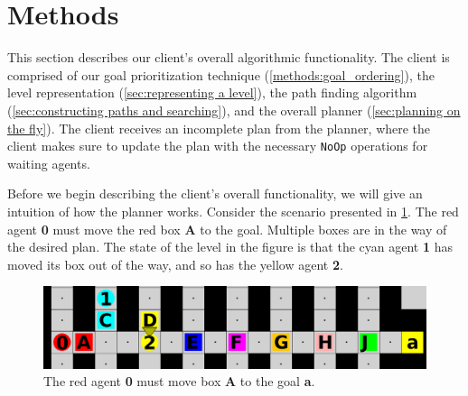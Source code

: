 \section{Methods}
\label{sec:methods}


This section describes our client's overall algorithmic functionality.
The client is comprised of our goal prioritization technique (\cref{methods:goal_ordering}), the level representation (\cref{sec:representing a level}), the path finding algorithm (\cref{sec:constructing paths and searching}), and the overall planner (\cref{sec:planning on the fly}).
The client receives an incomplete plan from the planner, where the client makes sure to update the plan with the necessary \texttt{NoOp} operations for waiting agents.

Before we begin describing the client's overall functionality, we will give an intuition of how the planner works.
Consider the scenario presented in \cref{fig:intuition example}.
The red agent \textbf{0} must move the red box \textbf{A} to the goal.
Multiple boxes are in the way of the desired plan.
The state of the level in the figure is that the cyan agent \textbf{1} has moved its box out of the way, and so has the yellow agent \textbf{2}.

\begin{figure}[ht!]
  \centering
  \includegraphics[width=.95\columnwidth]{graphics/planner_intuition.png}
  \caption{\label{fig:intuition example}The red agent \textbf{0} must move box \textbf{A} to the goal \textbf{a}.}
\end{figure}


